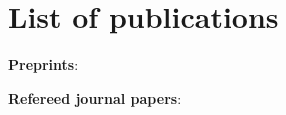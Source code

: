 \chapter{List of publications}

\noindent \textbf{Preprints}:

\noindent \textbf{Refereed journal papers}:
